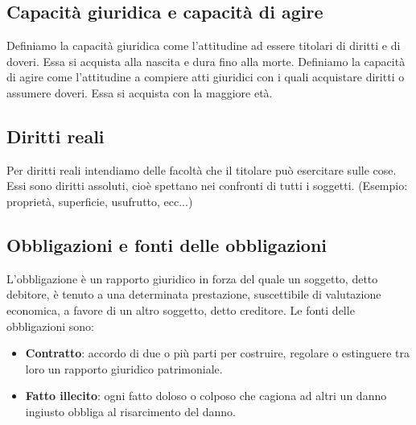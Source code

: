 \subsection{Capacità giuridica e capacità di agire}
Definiamo la capacità giuridica come l'attitudine ad essere titolari di diritti e di doveri. Essa si acquista alla nascita e dura fino alla morte.\newline
Definiamo la capacità di agire come l'attitudine a compiere atti giuridici con i quali acquistare diritti o assumere doveri. Essa si acquista con la maggiore età.

\subsection{Diritti reali}
Per diritti reali intendiamo delle facoltà che il titolare può esercitare sulle cose. Essi sono diritti assoluti, cioè spettano nei confronti di tutti i
soggetti. (Esempio: proprietà, superficie, usufrutto, ecc...)

\subsection{Obbligazioni e fonti delle obbligazioni}
L'obbligazione è un rapporto giuridico in forza del quale un soggetto, detto debitore, è tenuto a una determinata prestazione, suscettibile 
di valutazione economica, a favore di un altro soggetto, detto creditore.
Le fonti delle obbligazioni sono:
\begin{itemize}
    \item \textbf{Contratto}: accordo di due o più parti per costruire, regolare o estinguere tra loro un rapporto giuridico patrimoniale.
    \item \textbf{Fatto illecito}: ogni fatto doloso o colposo che cagiona ad altri un danno ingiusto obbliga al risarcimento del danno.
\end{itemize}

